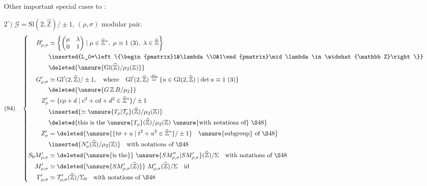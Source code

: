 Other important special cases to :

$2^\circ)$ $\mathcal G=\mathrm{Sl}(2,\widehat{\mathbb Z})/\pm1$, $(\rho,\sigma)$ modular pair.
\[
\begin{aligned}
(94)\quad\left\{\begin{aligned}
B'_{\rho,\sigma}&\simeq
\left\{\begin{pmatrix}\mu&\lambda\\0&1\end{pmatrix}
\mid\mu\in\widehat{\mathbb Z}^{*},\ \mu\equiv1\ (3),\ \lambda\in\widehat{\mathbb Z}\right\}\\
&\inserted{L_0=\left\{\begin{pmatrix}1&\lambda\\0&1\end{pmatrix}\mid\lambda\in\widehat{\mathbb Z}\right\}}\\
&\deleted{\unsure{\mathrm{Gl}(\widehat{\mathbb Z})/\mu_2(\mathbb Z)}}\\
G'_{\rho,\sigma}&\simeq\mathrm{Gl}'(2,\widehat{\mathbb Z})/\pm1,\quad\text{where}\quad
\mathrm{Gl}'(2,\widehat{\mathbb Z})\overset{\mathrm{dfn}}=
\{u\in\mathrm{Gl}(2,\widehat{\mathbb Z})\mid\det u\equiv1\ (3)\}\\
&\deleted{\unsure{G\,\mathbb Z\,B/\mu_2}}\\
Z'_{\rho}&=\{c\rho+d\mid c^2+cd+d^2\in\widehat{\mathbb Z}^{*}\}/\pm1\\
&\inserted{\simeq\unsure{T_\rho|\mathcal T_\rho}(\widehat{\mathbb Z})/\mu_2(\mathbb Z)}\\
&\deleted{\text{this is the}\ \unsure{T_\rho}(\widehat{\mathbb Z})/\mu_2(\mathbb Z)\ \text{\unsure{with notations of} \S48}}\\
Z'_{\sigma}&=\deleted{\unsure{\{t\sigma+u\mid t^2+u^2\in\widehat{\mathbb Z}^{*}\}/\pm1}\quad\text{\unsure{subgroup} of \S48}}\\
&\inserted{N'_{\sigma}(\widehat{\mathbb Z})/\mu_2(\mathbb Z)}\quad\text{with notations of \S48}\\
S_0M'_{\rho,\sigma}&\simeq\deleted{\text{\unsure{is the}}}\
\unsure{SM''_{\rho,\sigma}|SM'_{\rho,\sigma}}(\widehat{\mathbb Z})/\Sigma\quad\text{with notations of \S48}\\
M'_{\rho,\sigma}&\simeq\deleted{\unsure{SM'_{\rho,\sigma}(\widehat{\mathbb Z})}}\
M'_{\rho,\sigma}(\widehat{\mathbb Z})/\Sigma\quad\text{id}\\
\Gamma'_{\rho,\sigma}&\simeq\mathcal T'_{\rho,\sigma}(\widehat{\mathbb Z})/\Sigma_0\quad\text{with notations of \S48}
\end{aligned}\right.
\end{aligned}
\]


